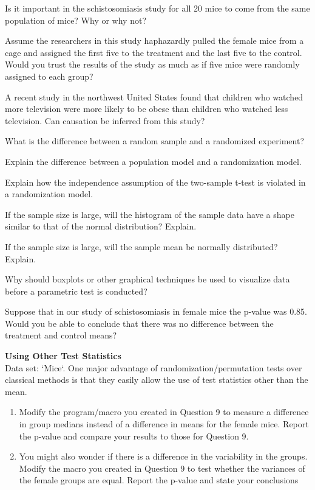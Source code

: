 \documentclass[
]{report}
\theoremstyle{definition}
\theoremstyle{definition}
\theoremstyle{definition}
\theoremstyle{definition}
\theoremstyle{remark}
\begin{document}
\begin{list}{E.}{ \setlength{\itemsep}{0.5em}}
  \item Is it important in the schistosomiasis study for all 20 mice to come from the same population of mice? Why or why not?
  \item Assume the researchers in this study haphazardly pulled the female mice from a cage and assigned the first five to the treatment and the last five to the control. Would you trust the results of the study as much as if five mice were randomly assigned to each group?
  \item A recent study in the northwest United States found that children who watched more television were
more likely to be obese than children who watched less television. Can causation be inferred from
this study?
  \item What is the difference between a random sample and a randomized experiment?
  \item Explain the difference between a population model and a randomization model.
  \item Explain how the independence assumption of the two-sample t-test is violated in a randomization model.
  \item If the sample size is large, will the histogram of the sample data have a shape similar to that of the normal distribution? Explain.
  \item If the sample size is large, will the sample mean be normally distributed? Explain.
  \item Why should boxplots or other graphical techniques be used to visualize data before a parametric test
is conducted?
  \item Suppose that in our study of schistosomiasis in female mice the p-value was 0.85. Would you be able to conclude that there was no difference between the treatment and control means?
  \item \textbf{Using Other Test Statistics} \\
  Data set: `Mice`. One major advantage of randomization/permutation tests over classical methods is that they easily allow the use of test statistics other than the mean.
  \begin{enumerate}
    \setcounter{enumi}{0}  
    \item Modify the program/macro you created in Question 9 to measure a difference in group medians instead of a difference in means for the female mice. Report the p-value and compare your results to those for Question 9.
    \item You might also wonder if there is a difference in the variability in the groups. Modify the macro
you created in Question 9 to test whether the variances of the female groups are equal. Report the
p-value and state your conclusions
  \end{enumerate}
  

\end{list}
\end{document}
